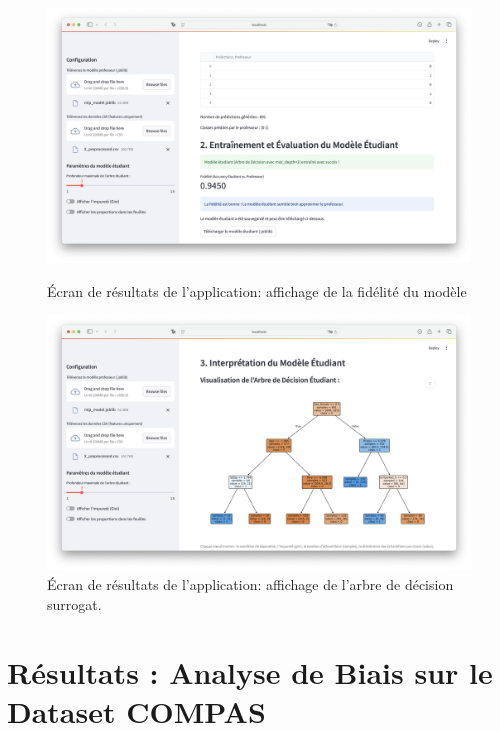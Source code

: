 \documentclass{article}
\begin{document}
\begin{figure}[h!]
    \centering
    \begin{minipage}[b]{0.48\textwidth}
        \centering
        \includegraphics[width=\textwidth]{app_fidelity.png}
        \caption{Écran de résultats de l'application: affichage de la fidélité du modèle}
        \label{fig:results_view}
    \end{minipage}
    \hfill
    \begin{minipage}[b]{0.48\textwidth}
        \centering
        \includegraphics[width=\textwidth]{app_tree.png}
        \caption{Écran de résultats de l'application: affichage de l'arbre de décision surrogat.}
        \label{fig:input_view}
    \end{minipage}
\end{figure}

\clearpage

\section{Résultats : Analyse de Biais sur le Dataset COMPAS}
\end{document}
